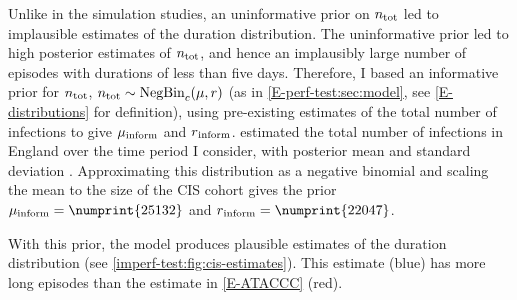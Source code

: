 \documentclass[thesis.tex]{subfiles}
\begin{document}
Unlike in the simulation studies, an uninformative prior on $n_\text{tot}$ led to implausible estimates of the duration distribution.
The uninformative prior led to high posterior estimates of $n_\text{tot}$, and hence an implausibly large number of episodes with durations of less than five days.
Therefore, I based an informative prior for $n_\text{tot}$, $n_\text{tot} \sim \operatorname{NegBin}_{c}(\mu, r)$ (as in \cref{E-perf-test:sec:model}, see \cref{E-distributions} for definition), using pre-existing estimates of the total number of infections to give $\mu{_{\text{inform}}}$ and $r{_{\text{inform}}}$.
\Textcite{birrellRTM2} estimated the total number of infections in England over the time period I consider, with posterior mean  and standard deviation .
Approximating this distribution as a negative binomial and scaling the mean to the size of the CIS cohort gives the prior $\mu\inform = \numprint{25132}$ and $r\inform = \numprint{22047}$.

With this prior, the model produces plausible estimates of the duration distribution (see \cref{imperf-test:fig:cis-estimates}).
This estimate (blue) has more long episodes than the estimate in \cref{E-ATACCC} (red).
\end{document}
